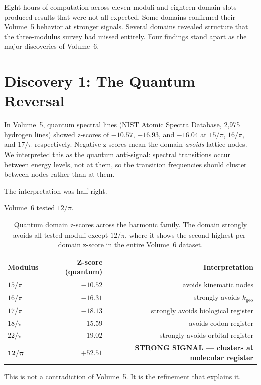 \documentclass[11pt, letterpaper, openany]{book}
\begin{document}
Eight hours of computation across eleven moduli and eighteen domain slots produced results that were not all expected.
Some domains confirmed their Volume~5 behavior at stronger signals. Several domains revealed structure that the three-modulus survey had missed entirely.
Four findings stand apart as the major discoveries of Volume~6.

\section*{Discovery 1: The Quantum Reversal}

In Volume~5, quantum spectral lines (NIST Atomic Spectra Database, 2,975 hydrogen lines) showed z-scores of $-10.57$, $-16.93$, and $-16.04$ at $15/\pi$, $16/\pi$, and $17/\pi$ respectively.
Negative z-scores mean the domain \emph{avoids} lattice nodes. We interpreted this as the quantum anti-signal: spectral transitions occur between energy levels, not at them, so the transition frequencies should cluster between nodes rather than at them.

The interpretation was half right.

Volume~6 tested $12/\pi$.

\begin{table}[H]
\centering
\renewcommand{\arraystretch}{1.3}
\begin{tabular}{|l|r|r|}
\hline
\textbf{Modulus} & \textbf{Z-score (quantum)} & \textbf{Interpretation} \\
\hline\hline
$15/\pi$ & $-10.52$ & avoids kinematic nodes \\
$16/\pi$ & $-16.31$ & strongly avoids $k_\text{geo}$ \\
$17/\pi$ & $-18.13$ & strongly avoids biological register \\
$18/\pi$ & $-15.59$ & avoids codon register \\
$22/\pi$ & $-19.02$ & strongly avoids orbital register \\
$\mathbf{12/\pi}$ & $\mathbf{+52.51}$ & \textbf{STRONG SIGNAL --- clusters at molecular register} \\
\hline
\end{tabular}
\caption{Quantum domain z-scores across the harmonic family.
The domain strongly avoids all tested moduli except $12/\pi$, where it shows the second-highest per-domain z-score in the entire Volume~6 dataset.}
\label{tab:quantum_reversal}
\end{table}

This is not a contradiction of Volume~5.
It is the refinement that explains it.
\end{document}

